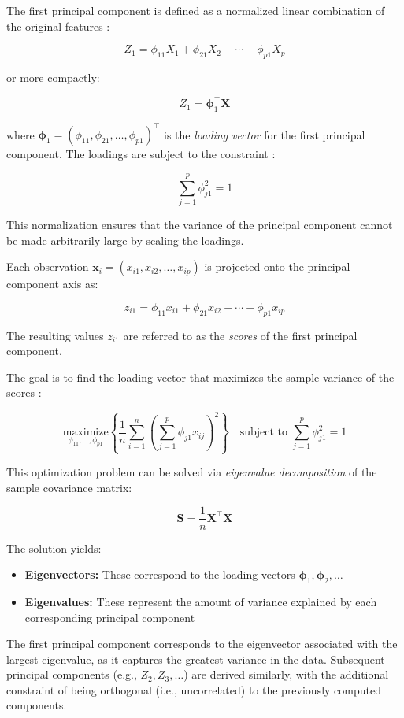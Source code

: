 \documentclass[conference]{IEEEtran}
\begin{document}
The first principal component is defined as a normalized linear combination of the original features \cite{James2021}:

\[
Z_1 = \phi_{11}X_1 + \phi_{21}X_2 + \cdots + \phi_{p1}X_p
\]

or more compactly:

\[
Z_1 = \boldsymbol{\phi}_1^{\top} \mathbf{X}
\]

where \( \boldsymbol{\phi}_1 = (\phi_{11}, \phi_{21}, \dots, \phi_{p1})^{\top} \) is the \textit{loading vector} for the first principal component. The loadings are subject to the constraint \cite{James2021}:

\[
\sum_{j=1}^{p} \phi_{j1}^2 = 1
\]

This normalization ensures that the variance of the principal component cannot be made arbitrarily large by scaling the loadings.

Each observation \( \mathbf{x}_i = (x_{i1}, x_{i2}, \dots, x_{ip}) \) is projected onto the principal component axis as:

\[
z_{i1} = \phi_{11} x_{i1} + \phi_{21} x_{i2} + \cdots + \phi_{p1} x_{ip}
\]

The resulting values \( z_{i1} \) are referred to as the \textit{scores} of the first principal component.

The goal is to find the loading vector that maximizes the sample variance of the scores \cite{James2021}:

\[
\underset{\phi_{11}, \dots, \phi_{p1}}{\text{maximize}} \left\{ \frac{1}{n} \sum_{i=1}^{n} \left( \sum_{j=1}^{p} \phi_{j1} x_{ij} \right)^2 \right\} \quad \text{subject to } \sum_{j=1}^{p} \phi_{j1}^2 = 1
\]

This optimization problem can be solved via \textit{eigenvalue decomposition} of the sample covariance matrix:

\[
\mathbf{S} = \frac{1}{n} \mathbf{X}^{\top} \mathbf{X}
\]

The solution yields:
\begin{itemize}
  \item \textbf{Eigenvectors:} These correspond to the loading vectors \( \boldsymbol{\phi}_1, \boldsymbol{\phi}_2, \dots \)
  \item \textbf{Eigenvalues:} These represent the amount of variance explained by each corresponding principal component
\end{itemize} 
\vspace{0.5em}
The first principal component corresponds to the eigenvector associated with the largest eigenvalue, as it captures the greatest variance in the data. Subsequent principal components (e.g., \( Z_2, Z_3, \dots \)) are derived similarly, with the additional constraint of being orthogonal (i.e., uncorrelated) to the previously computed components. \\
\end{document}
